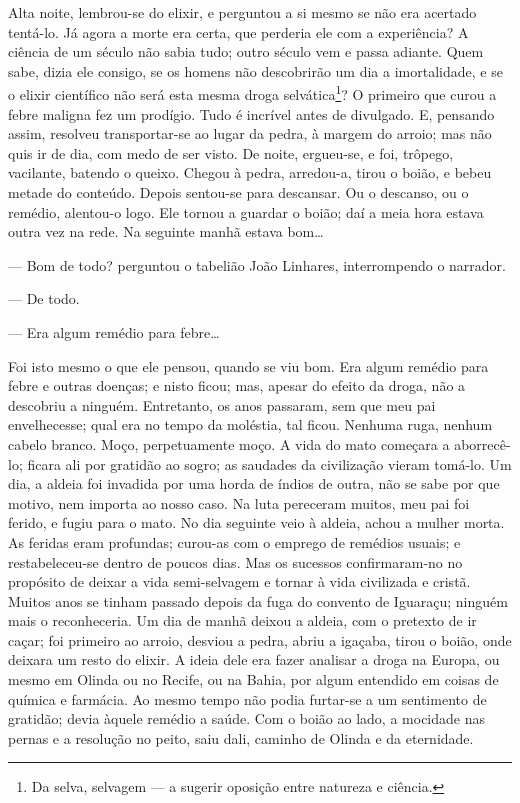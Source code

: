 Alta noite, lembrou-se do elixir, e perguntou a si mesmo se não era
acertado tentá-lo. Já agora a morte era certa, que perderia ele com a
experiência? A ciência de um século não sabia tudo; outro século vem e
passa adiante. Quem sabe, dizia ele consigo, se os homens não
descobrirão um dia a imortalidade, e se o elixir científico não será
esta mesma droga selvática\footnote{Da selva, selvagem --- a sugerir
  oposição entre natureza e ciência.}? O primeiro que curou a febre
maligna fez um prodígio. Tudo é incrível antes de divulgado. E, pensando
assim, resolveu transportar-se ao lugar da pedra, à margem do arroio;
mas não quis ir de dia, com medo de ser visto. De noite, ergueu-se, e
foi, trôpego, vacilante, batendo o queixo. Chegou à pedra, arredou-a,
tirou o boião, e bebeu metade do conteúdo. Depois sentou-se para
descansar. Ou o descanso, ou o remédio, alentou-o logo. Ele tornou a
guardar o boião; daí a meia hora estava outra vez na rede. Na seguinte
manhã estava bom\ldots{}

--- Bom de todo? perguntou o tabelião João Linhares, interrompendo o
narrador.

--- De todo.

--- Era algum remédio para febre\ldots{}

Foi isto mesmo o que ele pensou, quando se viu bom. Era algum remédio
para febre e outras doenças; e nisto ficou; mas, apesar do efeito da
droga, não a descobriu a ninguém. Entretanto, os anos passaram, sem que
meu pai envelhecesse; qual era no tempo da moléstia, tal ficou. Nenhuma
ruga, nenhum cabelo branco. Moço, perpetuamente moço. A vida do mato
começara a aborrecê-lo; ficara ali por gratidão ao sogro; as saudades da
civilização vieram tomá-lo. Um dia, a aldeia foi invadida por uma horda
de índios de outra, não se sabe por que motivo, nem importa ao nosso
caso. Na luta pereceram muitos, meu pai foi ferido, e fugiu para o mato.
No dia seguinte veio à aldeia, achou a mulher morta. As feridas eram
profundas; curou-as com o emprego de remédios usuais; e restabeleceu-se
dentro de poucos dias. Mas os sucessos confirmaram-no no propósito de
deixar a vida semi-selvagem e tornar à vida civilizada e cristã. Muitos
anos se tinham passado depois da fuga do convento de Iguaraçu; ninguém
mais o reconheceria. Um dia de manhã deixou a aldeia, com o pretexto de
ir caçar; foi primeiro ao arroio, desviou a pedra, abriu a igaçaba,
tirou o boião, onde deixara um resto do elixir. A ideia dele era fazer
analisar a droga na Europa, ou mesmo em Olinda ou no Recife, ou na
Bahia, por algum entendido em coisas de química e farmácia. Ao mesmo
tempo não podia furtar-se a um sentimento de gratidão; devia àquele
remédio a saúde. Com o boião ao lado, a mocidade nas pernas e a
resolução no peito, saiu dali, caminho de Olinda e da eternidade.





